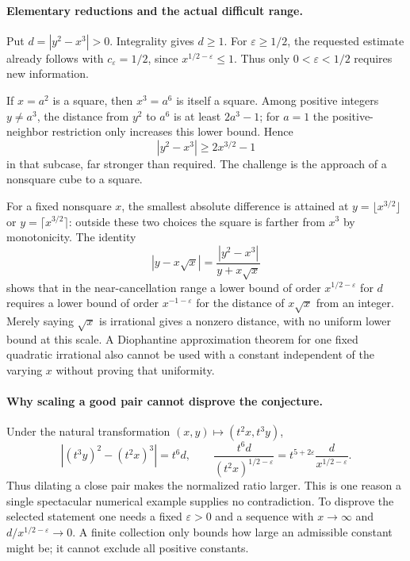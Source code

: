 \documentclass[11pt]{article}
\begin{document}
\paragraph{Elementary reductions and the actual difficult range.}
Put $d=|y^2-x^3|>0$. Integrality gives $d\geq1$. For $\varepsilon\geq1/2$, the requested estimate already follows with $c_\varepsilon=1/2$, since $x^{1/2-\varepsilon}\leq1$. Thus only $0<\varepsilon<1/2$ requires new information.

If $x=a^2$ is a square, then $x^3=a^6$ is itself a square. Among positive integers $y\ne a^3$, the distance from $y^2$ to $a^6$ is at least $2a^3-1$; for $a=1$ the positive-neighbor restriction only increases this lower bound. Hence
\[
                        |y^2-x^3|\geq2x^{3/2}-1
\]
in that subcase, far stronger than required. The challenge is the approach of a nonsquare cube to a square.

For a fixed nonsquare $x$, the smallest absolute difference is attained at $y=\lfloor x^{3/2}\rfloor$ or $y=\lceil x^{3/2}\rceil$: outside these two choices the square is farther from $x^3$ by monotonicity. The identity
\begin{equation}\label{a465:distance}
                 |y-x\sqrt{x}|=\frac{|y^2-x^3|}{y+x\sqrt{x}}
\end{equation}
shows that in the near-cancellation range a lower bound of order $x^{1/2-\varepsilon}$ for $d$ requires a lower bound of order $x^{-1-\varepsilon}$ for the distance of $x\sqrt x$ from an integer. Merely saying $\sqrt x$ is irrational gives a nonzero distance, with no uniform lower bound at this scale. A Diophantine approximation theorem for one fixed quadratic irrational also cannot be used with a constant independent of the varying $x$ without proving that uniformity.

\paragraph{Why scaling a good pair cannot disprove the conjecture.}
Under the natural transformation $(x,y)\mapsto(t^2x,t^3y)$,
\[
 |(t^3y)^2-(t^2x)^3|=t^6d,
 \qquad
 \frac{t^6d}{(t^2x)^{1/2-\varepsilon}}
       =t^{5+2\varepsilon}\frac d{x^{1/2-\varepsilon}}.
\]
Thus dilating a close pair makes the normalized ratio larger. This is one reason a single spectacular numerical example supplies no contradiction. To disprove the selected statement one needs a fixed $\varepsilon>0$ and a sequence with $x\to\infty$ and $d/x^{1/2-\varepsilon}\to0$. A finite collection only bounds how large an admissible constant might be; it cannot exclude all positive constants.
\end{document}
